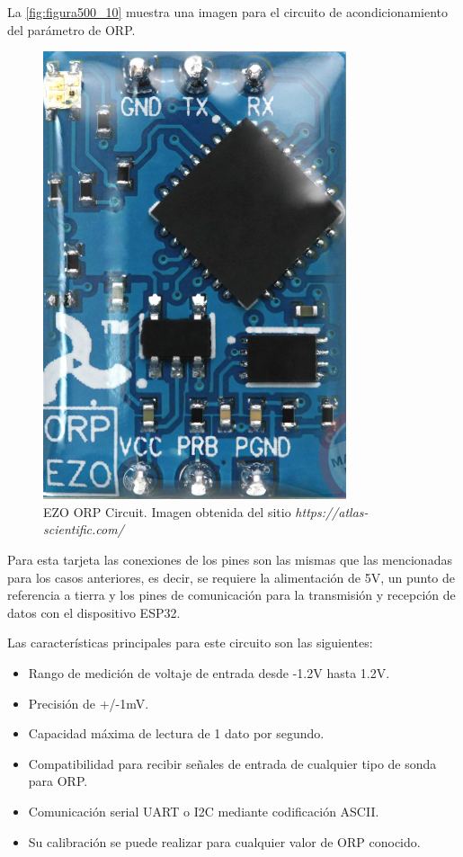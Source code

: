 La \autoref{fig:figura500_10} muestra una imagen para el circuito de acondicionamiento del parámetro de ORP.

\clearpage

\begin{figure}[h]
	\centering
	\includegraphics[scale=0.7]{imgss210.png}
	\caption{EZO ORP Circuit. Imagen obtenida del sitio \textit{https://atlas-scientific.com/}}
	\label{fig:figura500_10}
\end{figure}

Para esta tarjeta las conexiones de los pines son las mismas que las mencionadas para los casos anteriores, es decir, se requiere la alimentación de 5V, un punto de referencia a tierra y los pines de comunicación para la 
transmisión y recepción de datos con el dispositivo ESP32.

Las características principales para este circuito son las siguientes:

\begin{itemize}
    \item Rango de medición de voltaje de entrada desde -1.2V hasta 1.2V.
    \item Precisión de +/-1mV.
    \item Capacidad máxima de lectura de 1 dato por segundo.
    \item Compatibilidad para recibir señales de entrada de cualquier tipo de sonda para ORP.
    \item Comunicación serial UART o I2C mediante codificación ASCII.
    \item Su calibración se puede realizar para cualquier valor de ORP conocido.
\end{itemize}

